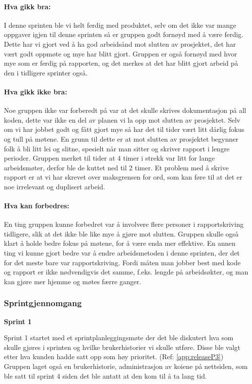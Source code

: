 \documentclass[12pt,a4paper,norsk]{article}
\begin{document}
\paragraph{Hva gikk bra:}
I denne sprinten ble vi helt ferdig med produktet, selv om det ikke var mange oppgaver igjen til denne sprinten så er gruppen godt fornøyd med å være ferdig. Dette har vi gjort ved å ha god arbeidsånd mot slutten av prosjektet, det har vært godt oppmøte og mye har blitt gjort.
Gruppen er også fornøyd med hvor mye som er ferdig på rapporten, og det merkes at det har blitt gjort arbeid på den i tidligere sprinter også.

\paragraph{Hva gikk ikke bra:}
Noe gruppen ikke var forberedt på var at det skulle skrives dokumentasjon på all koden, dette var ikke en del av planen vi la opp mot slutten av prosjektet.
Selv om vi har jobbet godt og fått gjort mye så har det til tider vært litt dårlig fokus og tull på møtene. En grunn til dette er at mot slutten av prosjektet begynner folk å bli litt lei og slitne, spesielt når man sitter og skriver rapport i lengre perioder. Gruppen merket til tider at 4 timer i strekk var litt for lange arbeidsmøter, derfor ble de kuttet ned til 2 timer.
Et problem med å skrive rapport er at vi har skrevet over maksgrensen for ord, som kan føre til at det er noe irrelevant og duplisert arbeid.

\paragraph{Hva kan forbedres:}
En ting gruppen kunne forbedret var å involvere flere personer i rapportskriving tidligere, slik at det ikke ble like mye å gjøre mot slutten.
Gruppen skulle også klart å holde bedre fokus på møtene, for å være enda mer effektive.
En annen ting vi kunne gjort bedre var å endre arbeidsmetoden i denne sprinten, der det for det meste bare var rapportskriving. Fordi måten man jobber best med kode og rapport er ikke nødvendigvis det samme, f.eks. lengde på arbeidsøkter, og man kan gjøre mer hjemme og møtes færre ganger.

  \subsubsection{Sprintgjennomgang}
\bigskip \noindent \textbf{Sprint 1}
\par Sprint 1 startet med et sprintplanleggingsmøte der det ble diskutert hva som  skulle gjøres i sprinten og hvilke brukerhistorier vi skulle utføre. Disse ble valgt etter hva kunden hadde satt opp som høy prioritet. (Ref: \cref{app:releaseP3}) Gruppen laget også en brukerhistorie, administrasjon av koiene på nettsiden, som ble satt til sprint 4 siden det ble antatt at den kom til å ta lang tid.
\end{document}
